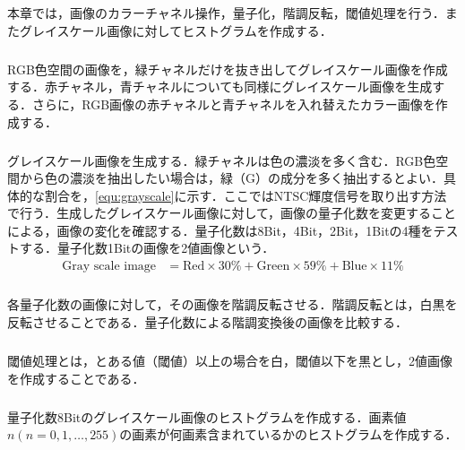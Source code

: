 \chapter{\kadaia}
\section{\purpose}
本章では，画像のカラーチャネル操作，量子化，階調反転，閾値処理を行う．またグレイスケール画像に対してヒストグラムを作成する．
\paragraph{\kadaiaa}RGB色空間の画像を，緑チャネルだけを抜き出してグレイスケール画像を作成する．赤チャネル，青チャネルについても同様にグレイスケール画像を生成する．さらに，RGB画像の赤チャネルと青チャネルを入れ替えたカラー画像を作成する．
\paragraph{\kadaiab}グレイスケール画像を生成する．緑チャネルは色の濃淡を多く含む．RGB色空間から色の濃淡を抽出したい場合は，緑（G）の成分を多く抽出するとよい．具体的な割合を，\eqref{equ:grayscale}に示す．ここではNTSC輝度信号を取り出す方法で行う．生成したグレイスケール画像に対して，画像の量子化数を変更することによる，画像の変化を確認する．量子化数は8Bit，4Bit，2Bit，1Bitの4種をテストする．量子化数1Bitの画像を2値画像という．
\begin{align}
    \textrm{Gray scale image} & = \textrm{Red}\times 30\% +\textrm{Green}\times 59\% +\textrm{Blue}\times 11\%\label{equ:grayscale}
\end{align}
\paragraph{\kadaiac}各量子化数の画像に対して，その画像を階調反転させる．階調反転とは，白黒を反転させることである．量子化数による階調変換後の画像を比較する．
\paragraph{\kadaiad}閾値処理とは，とある値（閾値）以上の場合を白，閾値以下を黒とし，2値画像を作成することである．
\paragraph{\kadaiae}量子化数8Bitのグレイスケール画像のヒストグラムを作成する．画素値\(n(n=0,1,\dots ,255)\)の画素が何画素含まれているかのヒストグラムを作成する．
